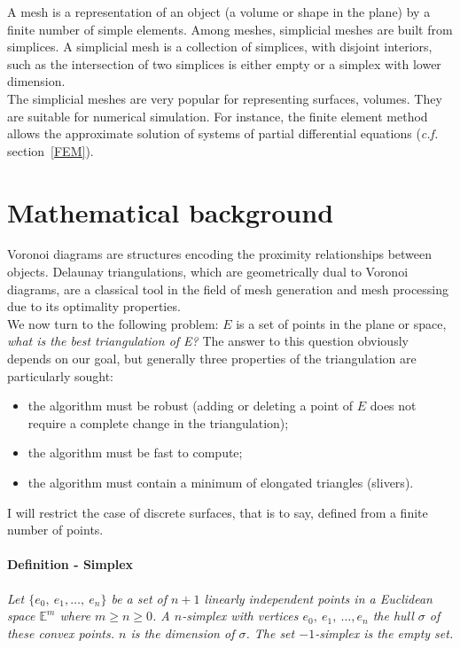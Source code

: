 A mesh is a representation of an object (a volume or shape in the plane) by a finite number of simple elements. Among meshes, simplicial meshes are built from simplices. A simplicial mesh is a collection of simplices, with disjoint interiors, such as the intersection of two simplices is either empty or a simplex with lower dimension. \\
The simplicial meshes are very popular for representing surfaces, volumes. They are suitable for numerical simulation. For instance, the finite element method allows the approximate solution of systems of partial differential equations ({\it c.f.} section~\ref{FEM}).


\section{Mathematical background}

Voronoi diagrams are structures encoding the proximity relationships between objects. Delaunay triangulations, which are geometrically dual to Voronoi diagrams, are a classical tool in the field of mesh generation and mesh processing due to its optimality properties.\\
We now turn to the following problem: $E$ is a set of points in the plane or space, {\it what is the best triangulation of E?} The answer to this question obviously depends on our goal, but generally three properties of the triangulation are particularly sought: \\

\begin {itemize}
\item the algorithm must be robust (adding or deleting a point of $E$ does not require a complete change in the triangulation);
\item the algorithm must be fast to compute;
\item the algorithm must contain a minimum of elongated triangles (slivers). \\
\end {itemize}

I will restrict the case of discrete surfaces, that is to say, defined from a finite number of points.

\paragraph{Definition - Simplex}
{
\it Let $\{e_{0},~e_{1}, \dots,~ e_{n} \}$ be a set of $n+1$ linearly independent points in a Euclidean space $\mathbb{E}^{m}$ where $m \ge n \ge 0$. A $n$-simplex with vertices $e_{0},~e_ {1},~\dots, e_{n}$ the hull $\sigma $ of these convex points. $n$ is the dimension of $\sigma$. The set $-1$-simplex is the empty set.
}

